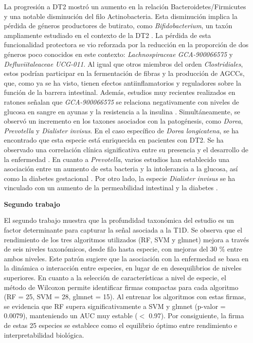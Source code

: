 La progresión a DT2 mostró un aumento en la relación Bacteroidetes/Firmicutes y una notable disminución del filo Actinobacteria. Esta disminución implica la pérdida de géneros productores de butirato, como \textit{Bifidobacterium}, un taxón ampliamente estudiado en el contexto de la DT2 \cite{larsen2010gut, wu2010molecular, le2013alterations}. La pérdida de esta funcionalidad protectora se vio reforzada por la reducción en la proporción de dos géneros poco conocidos en este contexto: \textit{Lachnospiraceae GCA-900066575} y \textit{Defluviitaleaceae UCG-011}. Al igual que otros miembros del orden \textit{Clostridiales}, estos podrían participar en la fermentación de fibras y la producción de AGCCs, que, como ya se ha visto, tienen efectos antiinflamatorios y reguladores sobre la función de la barrera intestinal. Además, estudios muy recientes realizados en ratones señalan que \textit{GCA-900066575} se relaciona negativamente con niveles de glucosa en sangre en ayunas y la resistencia a la insulina \cite{liu2023vitamin}. Simultáneamente, se observó un incremento en los taxones asociados con la patogénesis, como \textit{Dorea}, \textit{Prevotella} y \textit{Dialister invisus}. En el caso específico de \textit{Dorea longicatena}, se ha encontrado que esta especie está enriquecida en pacientes con DT2. Se ha observado una correlación clínica significativa entre su presencia y el desarrollo de la enfermedad \citep{qin2014alterations}. En cuanto a \textit{Prevotella}, varios estudios han establecido una asociación entre un aumento de esta bacteria y la intolerancia a la glucosa, así como la diabetes gestacional \citep{zhang2013human, egshatyan2016gut, hasain2020gut}. Por otro lado, la especie \textit{Dialister invisus} se ha vinculado con un aumento de la permeabilidad intestinal y la diabetes \citep{maffeis2016association, zheng2018gut}.

\textbf{Segundo trabajo}

El segundo trabajo \cite{paper2} muestra que la profundidad taxonómica del estudio es un factor determinante para capturar la señal asociada a la T1D. Se observa que el rendimiento de los tres algoritmos utilizados (RF, SVM y glmnet) mejora a través de seis niveles taxonómicos, desde filo hasta especie, con mejoras del 30 \% entre ambos niveles. Este patrón sugiere que la asociación con la enfermedad se basa en la dinámica o interacción entre especies, en lugar de en desequilibrios de niveles superiores. En cuanto a la selección de características a nivel de especie, el método de Wilcoxon permite identificar firmas compactas para cada algoritmo (RF = 25, SVM = 28, glmnet = 15). Al entrenar los algoritmos con estas firmas, se evidencia que RF supera significativamente a SVM y glmnet (p-valor = 0.0079), manteniendo un AUC muy estable ($<$ 0.97). Por consiguiente, la firma de estas 25 especies se establece como el equilibrio óptimo entre rendimiento e interpretabilidad biológica.


